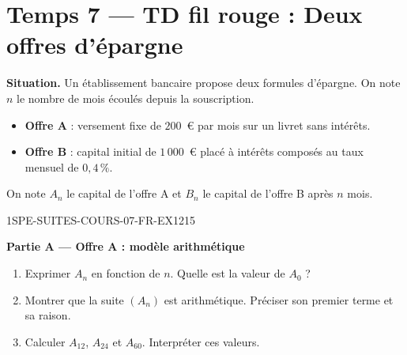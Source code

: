 

\section*{Temps 7 — TD fil rouge : Deux offres d'épargne}

\textbf{Situation.} Un établissement bancaire propose deux formules d'épargne. On note $n$ le nombre de mois écoulés depuis la souscription.

\begin{itemize}
  \item \textbf{Offre A} : versement fixe de $200$~€ par mois sur un livret sans intérêts.
  \item \textbf{Offre B} : capital initial de $1\,000$~€ placé à intérêts composés au taux mensuel de $0{,}4\,\%$.
\end{itemize}

On note $A_n$ le capital de l'offre A et $B_n$ le capital de l'offre B après $n$ mois.

\bigskip


\begin{exercice}{1SPE-SUITES-COURS-07-FR-EX1}{2}{15}

\textbf{Partie A — Offre A : modèle arithmétique}

\begin{enumerate}
  \item Exprimer $A_n$ en fonction de $n$. Quelle est la valeur de $A_0$ ?
  \item Montrer que la suite $(A_n)$ est arithmétique. Préciser son premier terme et sa raison.
  \item Calculer $A_{12}$, $A_{24}$ et $A_{60}$. Interpréter ces valeurs.
\end{enumerate}

\end{exercice}

